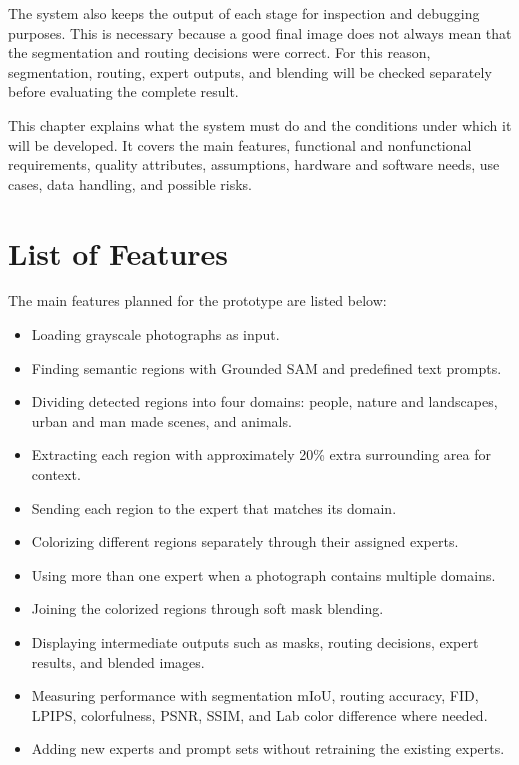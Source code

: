 \documentclass{FastFyp}
\begin{document}
The system also keeps the output of each stage for inspection and debugging purposes. This is necessary because a good final image does not always mean that the segmentation and routing decisions were correct. For this reason, segmentation, routing, expert outputs, and blending will be checked separately before evaluating the complete result.

This chapter explains what the system must do and the conditions under which it will be developed. It covers the main features, functional and nonfunctional requirements, quality attributes, assumptions, hardware and software needs, use cases, data handling, and possible risks.

\section{List of Features}

The main features planned for the prototype are listed below:

\begin{itemize}
    \item Loading grayscale photographs as input.
    
    \item Finding semantic regions with Grounded SAM and predefined text prompts.
    
    \item Dividing detected regions into four domains: people, nature and landscapes, urban and man made scenes, and animals.
    
    \item Extracting each region with approximately 20\% extra surrounding area for context.
    
    \item Sending each region to the expert that matches its domain.
    
    \item Colorizing different regions separately through their assigned experts.
    
    \item Using more than one expert when a photograph contains multiple domains.
    
    \item Joining the colorized regions through soft mask blending.
    
    \item Displaying intermediate outputs such as masks, routing decisions, expert results, and blended images.
    
    \item Measuring performance with segmentation mIoU, routing accuracy, FID, LPIPS, colorfulness, PSNR, SSIM, and Lab color difference where needed.
    
    \item Adding new experts and prompt sets without retraining the existing experts.
\end{itemize}
\end{document}
